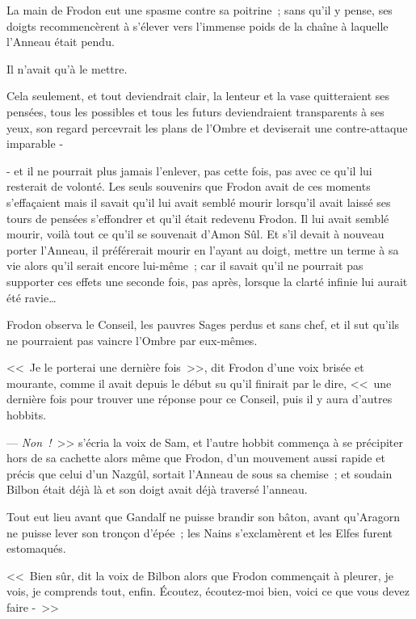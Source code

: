 La main de Frodon eut une spasme contre sa poitrine~; sans qu'il y pense, ses doigts recommencèrent à s'élever vers l'immense poids de la chaîne à laquelle l'Anneau était pendu.

Il n'avait qu'à le mettre.

Cela seulement, et tout deviendrait clair, la lenteur et la vase quitteraient ses pensées, tous les possibles et tous les futurs deviendraient transparents à ses yeux, son regard percevrait les plans de l'Ombre et deviserait une contre-attaque imparable -

- et il ne pourrait plus jamais l'enlever, pas cette fois, pas avec ce qu'il lui resterait de volonté. Les seuls souvenirs que Frodon avait de ces moments s'effaçaient mais il savait qu'il lui avait semblé mourir lorsqu'il avait laissé ses tours de pensées s'effondrer et qu'il était redevenu Frodon. Il lui avait semblé mourir, voilà tout ce qu'il se souvenait d'Amon Sûl. Et s'il devait à nouveau porter l'Anneau, il préférerait mourir en l'ayant au doigt, mettre un terme à sa vie alors qu'il serait encore lui-même~; car il savait qu'il ne pourrait pas supporter ces effets une seconde fois, pas après, lorsque la clarté infinie lui aurait été ravie…

Frodon observa le Conseil, les pauvres Sages perdus et sans chef, et il sut qu'ils ne pourraient pas vaincre l'Ombre par eux-mêmes.

<<~Je le porterai une dernière fois~>>, dit Frodon d'une voix brisée et mourante, comme il avait depuis le début su qu'il finirait par le dire, <<~une dernière fois pour trouver une réponse pour ce Conseil, puis il y aura d'autres hobbits.

--- \emph{Non~!}~>> s'écria la voix de Sam, et l'autre hobbit commença à se précipiter hors de sa cachette alors même que Frodon, d'un mouvement aussi rapide et précis que celui d'un Nazgûl, sortait l'Anneau de sous sa chemise~; et soudain Bilbon était déjà là et son doigt avait déjà traversé l'anneau.

Tout eut lieu avant que Gandalf ne puisse brandir son bâton, avant qu'Aragorn ne puisse lever son tronçon d'épée~; les Nains s'exclamèrent et les Elfes furent estomaqués.

<<~Bien sûr, dit la voix de Bilbon alors que Frodon commençait à pleurer, je vois, je comprends tout, enfin. Écoutez, écoutez-moi bien, voici ce que vous devez faire -~>>


